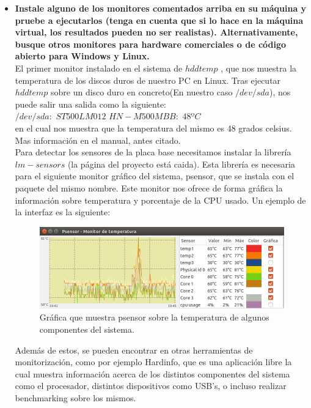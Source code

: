 \begin{itemize}
	\item \textbf{Instale alguno de los monitores comentados arriba en su máquina y
		pruebe a ejecutarlos (tenga en cuenta que si lo hace en la máquina virtual, los
		resultados pueden no ser realistas). Alternativamente, busque otros monitores para
		hardware comerciales o de código abierto para Windows y Linux.}\\
	El primer monitor instalado en el sistema de $hddtemp$ \cite{hddtemp}, que nos muestra la temperatura de los discos duros de nuestro PC en Linux. Tras ejecutar $hddtemp$ sobre un disco duro en concreto(En nuestro caso $/dev/sda$), nos puede salir una salida como la siguiente:\\
	
	$/dev/sda:$ $ST500LM012$ $HN-M500MBB:$ $48ºC$\\
	
	en el cual nos muestra que la temperatura del mismo es 48 grados celsius. Mas información en el manual, antes citado.\\
	
	Para detectar los sensores de la placa base necesitamos instalar la librería $lm-sensors$ \cite{sensors}(la página del proyecto está caida). Esta librería es necesaria para el siguiente monitor gráfico del sistema, psensor, que se instala con el paquete del mismo nombre. Este monitor nos ofrece de forma gráfica la información sobre temperatura y porcentaje de la CPU usado. Un ejemplo de la interfaz es la siguiente:\\
	
	\begin{figure}[H]
	\centering
	\includegraphics[width=0.7\linewidth]{psensor}
	\caption[psensor]{Gráfica que muestra psensor sobre la temperatura de algunos componentes del sistema.}
	\label{fig:psensor}
	\end{figure}
	
	Además de estos, se pueden encontrar en \cite{HWMon} otras herramientas de monitorización, como por ejemplo Hardinfo\cite{hardinfo}, que es una aplicación libre la cual muestra información acerca de los distintos componentes del sistema como el procesador, distintos dispositivos como USB's, o incluso realizar benchmarking sobre los mismos.\\
	

\end{itemize}
